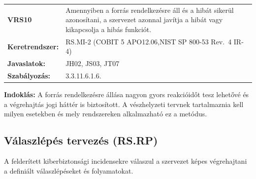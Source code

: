 \documentclass[12pt,magyar,a4paper,oneside]{scrreprt}
\begin{document}
\begin{longtable}[]{@{}ll@{}}
\toprule
\endhead
\begin{minipage}[t]{0.16\columnwidth}\raggedright
\textbf{VRS10}\strut
\end{minipage} & \begin{minipage}[t]{0.79\columnwidth}\raggedright
Amennyiben a forrás rendelkezésre áll és a hibát sikerül azonosítani, a
szervezet azonnal javítja a hibát vagy kikapcsolja a hibás
funkciót.\strut
\end{minipage}\tabularnewline
\begin{minipage}[t]{0.16\columnwidth}\raggedright
\textbf{Keretrendszer:}\strut
\end{minipage} & \begin{minipage}[t]{0.79\columnwidth}\raggedright
RS.MI-2 (COBIT 5 APO12.06,NIST SP 800-53 Rev.~4 IR-4)\strut
\end{minipage}\tabularnewline
\begin{minipage}[t]{0.16\columnwidth}\raggedright
\textbf{Javaslatok:}\strut
\end{minipage} & \begin{minipage}[t]{0.79\columnwidth}\raggedright
JH02, JS03, JT07\strut
\end{minipage}\tabularnewline
\begin{minipage}[t]{0.16\columnwidth}\raggedright
\textbf{Szabályozás:}\strut
\end{minipage} & \begin{minipage}[t]{0.79\columnwidth}\raggedright
3.3.11.6.1.6.\strut
\end{minipage}\tabularnewline
\bottomrule
\end{longtable}

\textbf{Indoklás: } A forrás rendelkezésre állása nagyon gyors
reakcióidőt tesz lehetővé és a végrehajtás jogi háttér is biztosított. A
vészhelyzeti tervnek tartalmaznia kell milyen esetekben és mely
rendszereken alkalmazható ez a metódus.

\hypertarget{vuxe1laszluxe9puxe9s-tervezuxe9s-rs.rp}{%
\subsection{Válaszlépés tervezés
(RS.RP)}\label{vuxe1laszluxe9puxe9s-tervezuxe9s-rs.rp}}

A felderített kiberbiztonsági incidensekre válaszul a szervezet képes
végrehajtani a definiált válaszlépéseket és folyamatokat.
\end{document}
